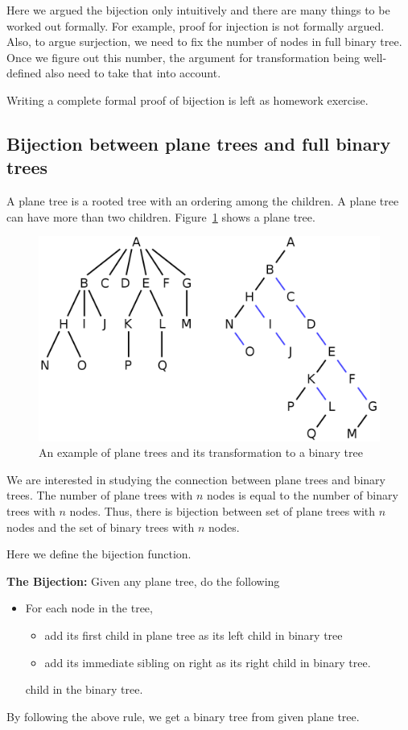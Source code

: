 Here we argued the bijection only intuitively and there are many things to be worked out formally. For example, proof for injection is not formally argued. Also, to argue surjection, we need to fix the number of nodes in full binary tree. Once we figure out this number, the argument for transformation being  well-defined also need to take that into account.

Writing a complete formal proof of bijection is left as homework exercise.

\subsection{Bijection between plane trees and full binary trees}
A plane tree is a rooted tree with an ordering among the children. A plane tree can have more than two children. Figure~\ref{fig:plane-tree-1} shows a plane tree. 

\begin{figure}[h!]
    \centering
    \includegraphics[width=0.8\linewidth]{images/plane-tree.png}
    \caption{An example of plane trees and its transformation to a binary tree}
    \label{fig:plane-tree-1}
\end{figure}

We are interested in studying the connection between plane trees and binary trees. The number of plane trees with $n$ nodes is equal to the number of binary trees with $n$ nodes. Thus, there is bijection between set of plane trees with $n$ nodes and the set of  binary trees with $n$ nodes. 

Here we define the bijection function. 

\noindent\textbf{The Bijection:} Given any plane tree, do the following
\begin{itemize}
    \item For each node in the tree, 
    \begin{itemize}
        \item add its first child in plane tree as its left child in binary tree
        \item add its immediate sibling on right as its right child in binary tree.
    \end{itemize} child in the binary tree.
\end{itemize}
By following the above rule, we get a binary tree from given plane tree.

